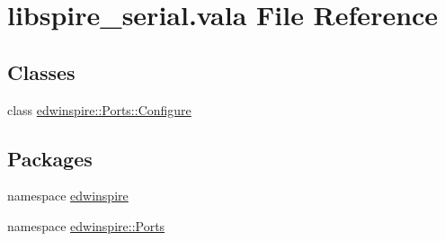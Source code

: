 \hypertarget{libspire__serial_8vala}{\section{libspire\-\_\-serial.\-vala File Reference}
\label{libspire__serial_8vala}
}
\subsection*{Classes}
\begin{DoxyCompactItemize}
\item 
class \hyperlink{classedwinspire_1_1_ports_1_1_configure}{edwinspire\-::\-Ports\-::\-Configure}
\end{DoxyCompactItemize}
\subsection*{Packages}
\begin{DoxyCompactItemize}
\item 
namespace \hyperlink{namespaceedwinspire}{edwinspire}
\item 
namespace \hyperlink{namespaceedwinspire_1_1_ports}{edwinspire\-::\-Ports}
\end{DoxyCompactItemize}
